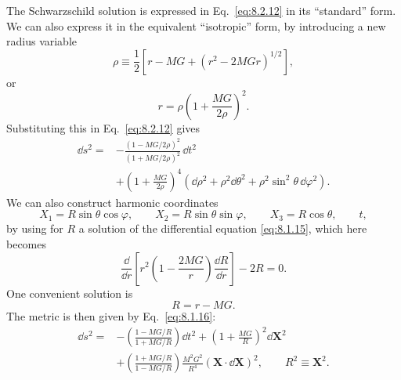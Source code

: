 The Schwarzschild solution is expressed in Eq.~\eqref{eq:8.2.12} in its
``standard'' form. We can also express it in the equivalent ``isotropic''
form, by introducing a new radius variable
\begin{equation}
  \rho
  \equiv
  \frac12\left[r-MG+\left(r^2-2MGr\right)^{1/2}\right],
  \tag{8.2.13}\label{eq:8.2.13}
\end{equation}
or
\[
  r=\rho\left(1+\frac{MG}{2\rho}\right)^2.
\]
Substituting this in Eq.~\eqref{eq:8.2.12} gives
\begin{equation}
  \begin{split}
  \dd s^2={}&
  -\frac{(1-MG/2\rho)^2}{(1+MG/2\rho)^2}\,\dd t^2\\
  &+\left(1+\frac{MG}{2\rho}\right)^4
  \left(\dd\rho^2+\rho^2\dd\theta^2
  +\rho^2\sin^2\theta\,\dd\varphi^2\right).
  \end{split}
  \tag{8.2.14}\label{eq:8.2.14}
\end{equation}
We can also construct harmonic coordinates
\[
  X_1=R\sin\theta\cos\varphi,\qquad
  X_2=R\sin\theta\sin\varphi,\qquad
  X_3=R\cos\theta,\qquad t,
\]
by using for \(R\) a solution of the differential equation
\eqref{eq:8.1.15}, which here becomes
\[
  \frac{\dd}{\dd r}
  \left[
    r^2\left(1-\frac{2MG}{r}\right)\frac{\dd R}{\dd r}
  \right]-2R=0.
\]
One convenient solution is
\[
  R=r-MG.
\]
The metric is then given by Eq.~\eqref{eq:8.1.16}:
\begin{equation}
  \begin{split}
  \dd s^2={}&
  -\left(\frac{1-MG/R}{1+MG/R}\right)\dd t^2
  +\left(1+\frac{MG}{R}\right)^2\dd\mathbf{X}^2\\
  &+\left(\frac{1+MG/R}{1-MG/R}\right)
  \frac{M^2G^2}{R^4}
  (\mathbf{X}\cdot \dd\mathbf{X})^2,
  \qquad R^2\equiv\mathbf{X}^2.
  \end{split}
  \tag{8.2.15}\label{eq:8.2.15}
\end{equation}

